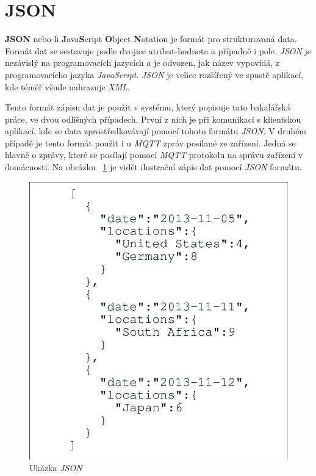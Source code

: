 \section{JSON}
\label{terminy:json}

\textbf{JSON} nebo-li \textbf{J}ava\textbf{S}cript \textbf{O}bject \textbf{N}otation je formát pro strukturovaná data. Formát dat se sestavuje podle dvojice atribut-hodnota a případně i pole.
\emph{JSON} je nezávislý na programovacích jazycích a je odvozen, jak název vypovídá, z programovacícho jazyka \emph{JavaScript}. \emph{JSON} je velice rozšířený ve spustě aplikací, kde téměř všude nahrazuje \emph{XML}.

Tento formát zápisu dat je použit v systému, který popisuje tato bakalářská práce, ve dvou odlišných případech. První z nich je při komunikaci s klientskou aplikací, kde se data zprostředkovávají pomocí tohoto formátu \emph{JSON}.
V druhém případě je tento formát použit i u \emph{MQTT} zpráv posílané ze zařízení. Jedná se hlavně o zprávy, které se posílají pomocí \emph{MQTT} protokolu na správu zařízení v domácnosti.
Na obrázku ~\ref{figure:json} je vidět ilustrační zápis dat pomocí \emph{JSON} formátu.

\begin{figure}[hbt]
  \centering
  \includegraphics[width=.45 \linewidth]{obrazky-figures/json_example.png}
  \caption{Ukázka \emph{JSON}}
  \label{figure:json}
\end{figure}

\newpage
